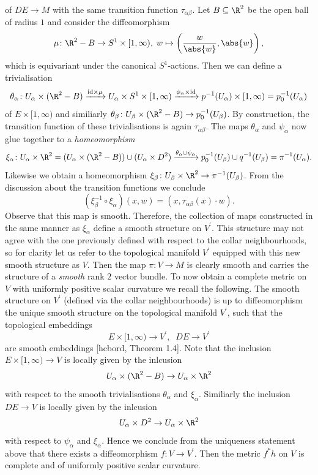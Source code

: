 of $DE \to M$ with the same transition function $\tau_{\alpha\beta}$. Let $B \subseteq \R^2$ be the open ball of radius $1$ and consider the diffeomorphism
\[
\mu \colon \R^2 - B \to S^1 \times [1,\infty), \; w \mapsto \left( \frac{w}{\abs{w}}, \abs{w} \right),
\]
which is equivariant under the canonical $S^1$-actions. Then we can define a trivialisation
\[
\theta_\alpha \colon U_\alpha \times (\R^2 - B) \xrightarrow{\mathrm{id} \times \mu} U_\alpha \times S^1 \times [1,\infty) \xrightarrow{\phi_\alpha \times \mathrm{id}} p^{-1}(U_\alpha) \times  [1,\infty) = p_0^{-1}(U_\alpha)
\]
of $E \times [1,\infty)$ and similiarly $\theta_\beta \colon U_\beta \times (\R^2 - B) \to p_0^{-1}(U_\beta)$. By construction, the transition function of these trivialisations is again $\tau_{\alpha\beta}$. The maps $\theta_\alpha$ and $\psi_\alpha$ now glue together to a \textit{homeomorphism} 
\[
\xi_\alpha \colon U_\alpha \times \R^2 = (U_\alpha \times (\R^2 - B)) \cup (U_\alpha \times D^2)\xrightarrow{\theta_\alpha \cup \psi_\alpha} p_0^{-1}(U_\beta) \cup q^{-1}(U_\beta) = \pi^{-1}(U_\alpha).
\] 
Likewise we obtain a homeomorphism $\xi_\beta \colon  U_\beta \times \R^2 \to \pi^{-1}(U_\beta)$. From the discussion about the transition functions we conclude 
\[
(\xi_\beta^{-1} \circ \xi_\alpha)(x,w) = (x, \tau_{\alpha\beta}(x) \cdot w).
\]
Observe that this map is smooth. Therefore, the collection of maps constructed in the same manner as $\xi_\alpha$ define a smooth structure on $V^\prime$. This structure may not agree with the one previously defined with respect to the collar neighbourhoods, so for clarity let us refer to the topological manifold $V^\prime$ equipped with this new smooth structure as $V$. Then the map $\pi \colon V \to M$ is clearly smooth and carries the structure of a \textit{smooth} rank $2$ vector bundle. To now obtain a complete metric on $V$ with uniformly positive scalar curvature we recall the following. The smooth structure on $V^\prime$ (defined via the collar neighbourhoods) is up to diffeomorphism the unique smooth structure on the topological manifold $V^\prime$, such that the topological embeddings 
\[
E \times [1,\infty) \to V^\prime, \; \; DE \to V^\prime
\]
are smooth embeddings [hcbord, Theorem 1.4]. Note that the inclusion $E \times [1,\infty) \to V$ is locally given by the inlcusion
\[
U_\alpha \times (\R^2 - B) \to U_\alpha \times \R^2 
\]
with respect to the smooth trivialisations $\theta_\alpha$ and $\xi_\alpha$. Similiarly the inclusion $DE \to V$ is locally given by the inlcusion 
\[
U_\alpha \times D^2 \to U_\alpha \times \R^2 
\]
with respect to $\psi_\alpha$ and $\xi_\alpha$. Hence we conclude from the uniqueness statement above that there exists a diffeomorphism $f \colon V \to V^\prime$. Then the metric $f^\ast h$ on $V$ is complete and of uniformly positive scalar curvature.

